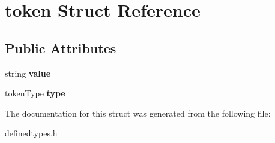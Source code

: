 \hypertarget{structtoken}{\section{token \-Struct \-Reference}
\label{structtoken}
}
\subsection*{\-Public \-Attributes}
\begin{DoxyCompactItemize}
\item 
\hypertarget{structtoken_adff15f8f8afc99687b475f5cfc78dc1a}{string {\bfseries value}}\label{structtoken_adff15f8f8afc99687b475f5cfc78dc1a}

\item 
\hypertarget{structtoken_ac78fc1cb2d12e6bd8c79bfc509caf4f4}{token\-Type {\bfseries type}}\label{structtoken_ac78fc1cb2d12e6bd8c79bfc509caf4f4}

\end{DoxyCompactItemize}


\-The documentation for this struct was generated from the following file\-:\begin{DoxyCompactItemize}
\item 
definedtypes.\-h\end{DoxyCompactItemize}
